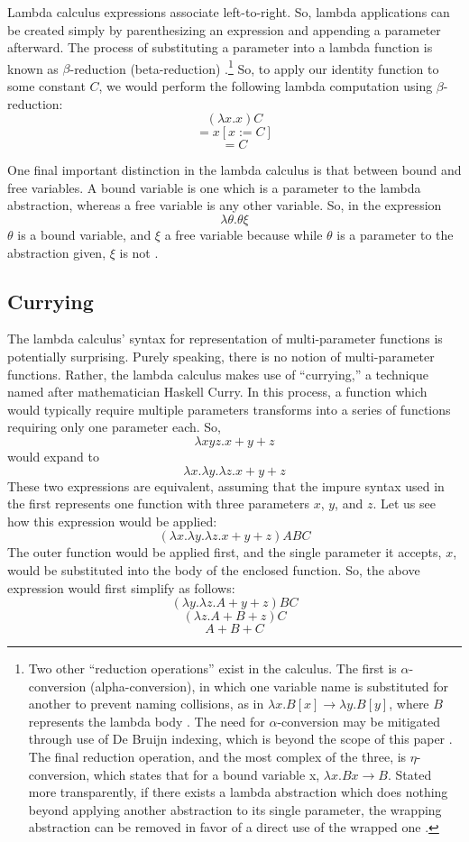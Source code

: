 \documentclass[twocolumn,titlepage,12pt]{article}
\begin{document}
Lambda calculus expressions associate left-to-right. So, lambda applications can be created simply by parenthesizing an expression and appending a parameter afterward. The process of substituting a parameter into a lambda function is known as $\beta$-reduction (beta-reduction) \cite{hudakintro}.\footnote{Two other ``reduction operations'' exist in the calculus. The first is $\alpha$-conversion (alpha-conversion), in which one variable name is substituted for another to prevent naming collisions, as in $\lambda x.B[x] \to \lambda y.B[y]$, where $B$ represents the lambda body \cite{hudakintro}. The need for $\alpha$-conversion may be mitigated through use of De Bruijn indexing, which is beyond the scope of this paper \cite{debruijn}. The final reduction operation, and the most complex of the three, is $\eta$-conversion, which states that for a bound variable x, $\lambda x.Bx \to B$. Stated more transparently, if there exists a lambda abstraction which does nothing beyond applying another abstraction to its single parameter, the wrapping abstraction can be removed in favor of a direct use of the wrapped one \cite{etared}.} So, to apply our identity function to some constant $C$, we would perform the following lambda computation using $\beta$-reduction:
$$(\lambda x.x)C$$
$$=x[x:=C]$$
$$=C$$

One final important distinction in the lambda calculus is that between bound and free variables. A bound variable is one which is a parameter to the lambda abstraction, whereas a free variable is any other variable. So, in the expression
$$\lambda \theta.\theta \xi$$
$\theta$ is a bound variable, and $\xi$ a free variable because while $\theta$ is a parameter to the abstraction given, $\xi$ is not \cite{stanfordlc}.

\subsection{Currying}
The lambda calculus' syntax for representation of multi-parameter functions is potentially surprising. Purely speaking, there is no notion of multi-parameter functions. Rather, the lambda calculus makes use of ``currying,'' a technique named after mathematician Haskell Curry. In this process, a function which would typically require multiple parameters transforms into a series of functions requiring only one parameter each. So,
$$\lambda xyz.x+y+z$$
would expand to
$$\lambda x.\lambda y.\lambda z.x+y+z$$
These two expressions are equivalent, assuming that the impure syntax used in the first represents one function with three parameters $x$, $y$, and $z$. Let us see how this expression would be applied:
$$(\lambda x.\lambda y.\lambda z.x+y+z)ABC$$
The outer function would be applied first, and the single parameter it accepts, $x$, would be substituted into the body of the enclosed function. So, the above expression would first simplify as follows:
$$(\lambda y.\lambda z.A+y+z)BC$$
$$(\lambda z.A+B+z)C$$
$$A+B+C$$
\end{document}
